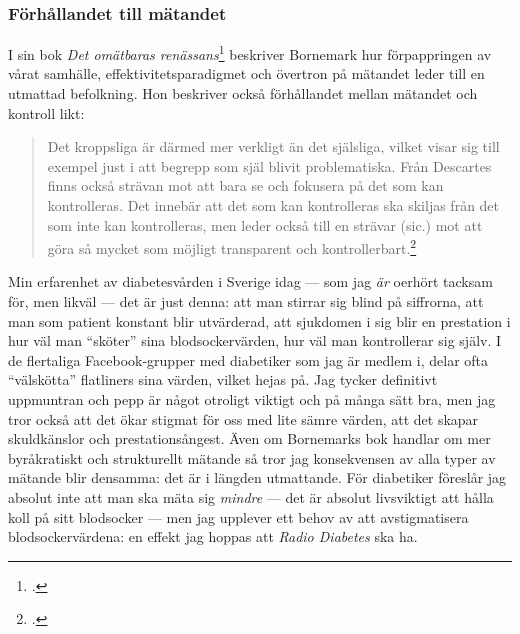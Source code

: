 \documentclass[11pt, a4paper]{article} %
\begin{document}
\subsubsection*{Förhållandet till mätandet}
I sin bok \emph{Det omätbaras renässans}\footcite{bornemark_det_2018} beskriver Bornemark hur förpappringen av vårat samhälle, effektivitetsparadigmet och övertron på mätandet leder till en utmattad befolkning. Hon beskriver också förhållandet mellan mätandet och kontroll likt: 
\begin{quote}
  Det kroppsliga är därmed mer verkligt än det själsliga, vilket visar sig till exempel just i att begrepp som själ blivit problematiska. Från Descartes finns också strävan mot att bara se och fokusera på det som kan kontrolleras. Det innebär att det som kan kontrolleras ska skiljas från det som inte kan kontrolleras, men leder också till en strävar (sic.) mot att göra så mycket som möjligt transparent och kontrollerbart.\footcite[93]{bornemark_det_2018}
\end{quote}
Min erfarenhet av diabetesvården i Sverige idag --- som jag \emph{är} oerhört tacksam för, men likväl --- det är just denna: att man stirrar sig blind på siffrorna, att man som patient konstant blir utvärderad, att sjukdomen i sig blir en prestation i hur väl man ``sköter'' sina blodsockervärden, hur väl man kontrollerar sig själv. I de flertaliga Facebook-grupper med diabetiker som jag är medlem i, delar ofta ``välskötta'' flatliners sina värden, vilket hejas på. Jag tycker definitivt uppmuntran och pepp är något otroligt viktigt och på många sätt bra, men jag tror också att det ökar stigmat för oss med lite sämre värden, att det skapar skuldkänslor och prestationsångest. Även om Bornemarks bok handlar om mer byråkratiskt och strukturellt mätande så tror jag konsekvensen av alla typer av mätande blir densamma: det är i längden utmattande. För diabetiker föreslår jag absolut inte att man ska mäta sig \emph{mindre} --- det är absolut livsviktigt att hålla koll på sitt blodsocker --- men jag upplever ett behov av att avstigmatisera blodsockervärdena: en effekt jag hoppas att \emph{Radio Diabetes} ska ha.
\end{document}
